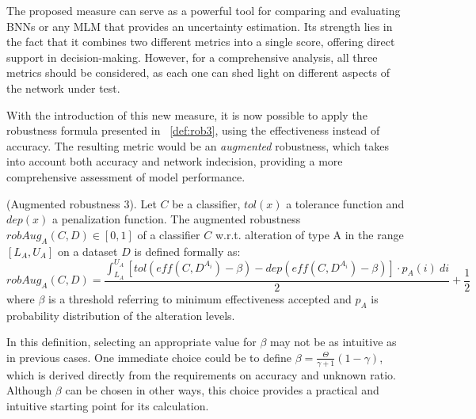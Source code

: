 The proposed measure can serve as a powerful tool for comparing and evaluating BNNs or any MLM that provides an uncertainty estimation. Its strength lies in the fact that it combines two different metrics into a single score, offering direct support in decision-making. However, for a comprehensive analysis, all three metrics should be considered, as each one can shed light on different aspects of the network under test.

With the introduction of this new measure, it is now possible to apply the robustness formula presented in \Def~\ref{def:rob3}, using the effectiveness instead of accuracy. The resulting metric would be an \textit{augmented} robustness, which takes into account both accuracy and network indecision, providing a more comprehensive assessment of model performance.

\begin{definition}\label{def:robaug} (Augmented robustness 3).
	Let $C$ be a classifier, $tol(x)$ a tolerance function and $dep(x)$ a penalization function.
	The augmented robustness $robAug_A(C,D) \in [0,1]$ of a classifier $C$ w.r.t. alteration of type A in the range $[L_A, U_A]$ on a dataset $D$ is defined formally as:
	\[
		robAug_A(C,D) = \frac{\int_{L_A}^{U_A} [tol(eff(C,D^{A_i}) - \beta) - dep(eff(C,D^{A_i}) - \beta)] \cdot p_A(i)\ di}{2} + \frac{1}{2}
	\]
	where $\beta$ is a threshold referring to minimum effectiveness accepted and $p_A$ is probability distribution of the alteration levels.
\end{definition}

In this definition, selecting an appropriate value for $\beta$ may not be as intuitive as in previous cases. One immediate choice could be to define $\beta = \frac{\Theta}{\gamma + 1}(1-\gamma)$, which is derived directly from the requirements on accuracy and unknown ratio. Although $\beta$ can be chosen in other ways, this choice provides a practical and intuitive starting point for its calculation.